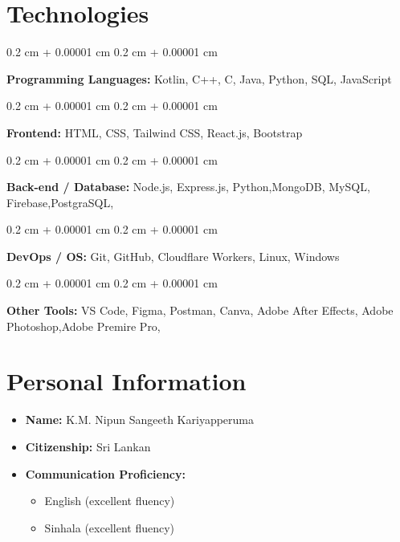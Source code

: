 \documentclass[10pt, letterpaper]{article}
\newenvironment{highlights}{
	\begin{itemize}[
		topsep=0.10 cm,
		parsep=0.10 cm,
		partopsep=0pt,
		itemsep=0pt,
		leftmargin=0.4 cm + 10pt
		]
	}{
	\end{itemize}
} %
\newenvironment{onecolentry}{
	\begin{adjustwidth}{
			0.2 cm + 0.00001 cm
		}{
			0.2 cm + 0.00001 cm
		}
	}{
	\end{adjustwidth}
} %
\begin{document}
	
	\vspace{0.2 cm}
	
	
	
	
	
	
	\section{Technologies}
	
	\begin{onecolentry}
		\textbf{Programming Languages:} Kotlin, C++, C, Java, Python, SQL, JavaScript
	\end{onecolentry}
	
	\vspace{0.2 cm}
	
	\begin{onecolentry}
		\textbf{Frontend:} HTML, CSS, Tailwind CSS, React.js, Bootstrap
	\end{onecolentry}
	\vspace{0.2 cm}
	\begin{onecolentry}
		\textbf{Back-end / Database:} Node.js, Express.js, Python,MongoDB, MySQL, Firebase,PostgraSQL, 
	\end{onecolentry}
	\vspace{0.2 cm}
	\begin{onecolentry}
		\textbf{DevOps / OS:} Git, GitHub, Cloudflare Workers, Linux, Windows
	\end{onecolentry}
	\vspace{0.2 cm}
	\begin{onecolentry}
		\textbf{Other Tools:} VS Code, Figma, Postman, Canva,  Adobe After Effects, Adobe Photoshop,Adobe Premire Pro,
	\end{onecolentry}
	
	
	
	
	
	\section{Personal Information }
	
	\begin{highlights}
		\item \textbf{Name:} K.M. Nipun Sangeeth Kariyapperuma
		\item \textbf{Citizenship:} Sri Lankan
		\item \textbf{Communication Proficiency:}
		\begin{itemize}
			\item English (excellent fluency)
			\item Sinhala (excellent fluency)
		\end{itemize}
	\end{highlights}
	
	
	
	
\end{document}
